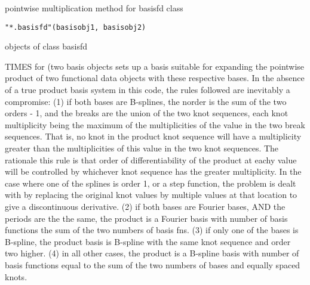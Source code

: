 \begin{Description}\relax
pointwise multiplication method for basisfd class
\end{Description}
\begin{Usage}
\begin{verbatim}
"*.basisfd"(basisobj1, basisobj2)
\end{verbatim}
\end{Usage}
\begin{Arguments}
\begin{ldescription}
\item[\code{basisobj1, basisobj2}] objects of class basisfd 

\end{ldescription}
\end{Arguments}
\begin{Details}\relax
TIMES for (two basis objects sets up a basis suitable for expanding
the pointwise product of two functional data objects with these
respective bases.  In the absence of a true product basis system in
this code, the rules followed are inevitably a compromise:
(1) if both bases are B-splines, the norder is the sum of the
two orders - 1, and the breaks are the union of the
two knot sequences, each knot multiplicity being the maximum
of the multiplicities of the value in the two break sequences.
That is, no knot in the product knot sequence will have a
multiplicity greater than the multiplicities of this value
in the two knot sequences.  
The rationale this rule is that order of differentiability
of the product at eachy value will be controlled  by
whichever knot sequence has the greater multiplicity.  
In the case where one of the splines is order 1, or a step
function, the problem is dealt with by replacing the
original knot values by multiple values at that location
to give a discontinuous derivative.
(2) if both bases are Fourier bases, AND the periods are the 
the same, the product is a Fourier basis with number of
basis functions the sum of the two numbers of basis fns.
(3) if only one of the bases is B-spline, the product basis
is B-spline with the same knot sequence and order two
higher.
(4) in all other cases, the product is a B-spline basis with
number of basis functions equal to the sum of the two
numbers of bases and equally spaced knots.
\end{Details}
\begin{SeeAlso}\relax
{}
\end{SeeAlso}

